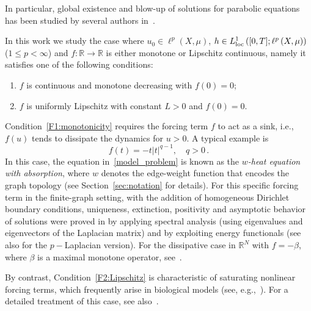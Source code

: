 \documentclass[journal]{article}
\theoremstyle{nonitalic}
\theoremstyle{nonitalic}
\theoremstyle{plain} %
\numberwithin{equation}{section}
\newcommand{\R}{\mathbb{R}}
\begin{document}
 
In particular, global existence and blow-up of solutions for parabolic equations has been studied by several authors in~\cite{grillo2024blow,punzo2025semilinear,wu2024blow,wu2021blow,monticelli2024nonexistence,lin2017existence,yong2018blow,slavik2017well,hu2026life}. 

 In this work we study the case where $u_0 \in \ell^p(X,\mu)$, $h \in L^1_{\textnormal{loc}}\left([0,T]; \ell^p\left(X,\mu\right)\right)$ ($1\leq p <\infty$) and $f: \R \rightarrow \R$ is either monotone or Lipschitz continuous, namely it satisfies one of the following conditions: 
\begin{enumerate}[label=\textbf{(F\arabic*)},ref=\textbf{(F\arabic*)}]
    \item\label{F1:monotonicity} $f$ is continuous and monotone decreasing with $f(0)=0$;
    \item\label{F2:Lipschitz} $f$ is uniformly Lipschitz with constant $L>0$ and $f(0)=0$.
\end{enumerate}
Condition~\ref{F1:monotonicity} requires the forcing term \(f\) to act as a sink, i.e., \(f(u)\) tends to dissipate the dynamics for \(u>0\). A typical example is  
\begin{equation}\label{specific}
f(t) = -t|t|^{q-1}, \quad q>0\,.
\end{equation}
In this case, the equation in~\ref{model_problem} is known as the \textit{\(w\)-heat equation with absorption}, where \(w\) denotes the edge-weight function that encodes the graph topology (see Section~\ref{sec:notation} for details).  For this specific forcing term in the finite-graph setting, with the addition of homogeneous Dirichlet boundary conditions, uniqueness, extinction, positivity and asymptotic behavior of solutions were proved in \cite{chung2011extinction} by applying spectral analysis (using eigenvalues and eigenvectors of the Laplacian matrix) and by exploiting energy functionals (see also \cite{chung2017plaplacian} for the $p-$Laplacian version). For the dissipative case in \(\R^N\) with \(f=-\beta\), where \(\beta\) is a maximal monotone operator, see~\cite[Chapter~5]{barbu2010nonlinear}.  

By contrast, Condition~\ref{F2:Lipschitz} is characteristic of saturating nonlinear forcing terms, which frequently arise in biological models (see, e.g.,~\cite{cantrell2004spatial}). For a detailed treatment of this case, see also~\cite[Chapter~31.6]{zeidler2013nonlinear}.
\end{document}
